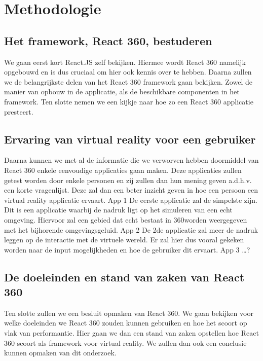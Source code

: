 
\chapter{Methodologie}
\label{ch:methodologie}


\section{Het framework, React 360, bestuderen}
\label{sec:reactvr-bestuderen}
We gaan eerst kort React.JS zelf bekijken. Hiermee wordt React 360 namelijk opgebouwd en is dus cruciaal om hier ook kennis over te hebben. Daarna zullen we de belangrijkste delen van het React 360 framework gaan bekijken. Zowel de manier van opbouw in de applicatie, als de beschikbare componenten in het framework. Ten slotte nemen we een kijkje naar hoe zo een React 360 applicatie presteert.

\section{Ervaring van virtual reality voor een gebruiker}
\label{sec:ervaring-vr-app}
Daarna kunnen we met al de informatie die we verworven hebben doormiddel van React 360 enkele eenvoudige applicaties gaan maken. Deze applicaties zullen getest worden door enkele personen en zij zullen dan hun mening geven a.d.h.v. een korte vragenlijst. Deze zal dan een beter inzicht geven in hoe een persoon een virtual reality applicatie ervaart.
App 1
De eerste applicatie zal de simpelste zijn. Dit is een applicatie waarbij de nadruk ligt op het simuleren van een echt omgeving. Hiervoor zal een gebied dat echt bestaat in 360\textdegree worden weergegeven met het bijhorende omgevingsgeluid. 
App 2
De 2de applicatie zal meer de nadruk leggen op de interactie met de virtuele wereld. Er zal hier dus vooral gekeken worden naar de input mogelijkheden en hoe de gebruiker dit ervaart.
App 3
…?

\section{De doeleinden en stand van zaken van React 360}
\label{sec:doeleinden-reactvr}
Ten slotte zullen we een besluit opmaken van React 360. We gaan bekijken voor welke doeleinden we React 360 zouden kunnen gebruiken en hoe het scoort op vlak van performantie. Hier gaan we dan een stand van zaken opstellen hoe React 360 scoort als framework voor virtual reality. We zullen dan ook een conclusie kunnen opmaken van dit onderzoek.



